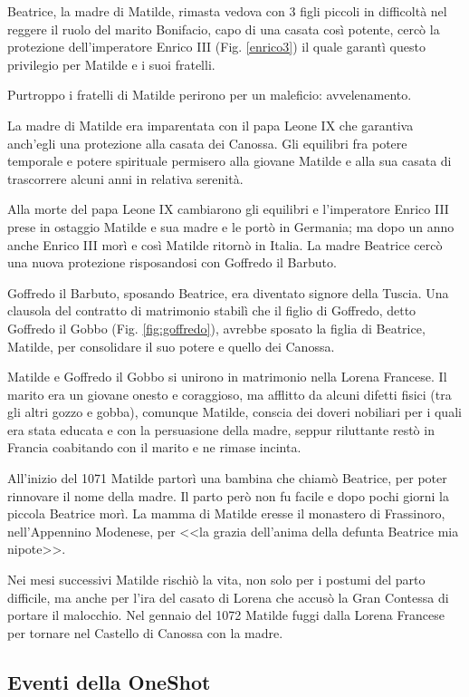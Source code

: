 \documentclass[letterpaper,twocolumn,openany,nodeprecatedcode]{dndbook}
\begin{document}
Beatrice, la madre di Matilde, rimasta vedova con 3 figli piccoli in difficoltà nel reggere il ruolo del marito Bonifacio, capo di una casata così potente, cercò la protezione dell'imperatore Enrico III (Fig. \ref{enrico3}) il quale garantì questo privilegio per Matilde e i suoi fratelli.

Purtroppo i fratelli di Matilde perirono per un maleficio: avvelenamento.

La madre di Matilde era imparentata con il papa Leone IX che garantiva anch'egli una protezione alla casata dei Canossa. Gli equilibri fra potere temporale e potere spirituale permisero alla giovane Matilde e alla sua casata di trascorrere alcuni anni in relativa serenità.

Alla morte del papa Leone IX cambiarono gli equilibri e l'imperatore Enrico III prese in ostaggio Matilde e sua madre e le portò in Germania; ma dopo un anno anche Enrico III morì e così Matilde ritornò in Italia. La madre Beatrice cercò una nuova protezione risposandosi con Goffredo il Barbuto.

Goffredo il Barbuto, sposando Beatrice, era diventato signore della Tuscia. Una clausola del contratto di matrimonio stabilì che il figlio di Goffredo, detto Goffredo il Gobbo (Fig. \ref{fig:goffredo}), avrebbe sposato la figlia di Beatrice, Matilde, per consolidare il suo potere e quello dei Canossa.

Matilde e Goffredo il Gobbo si unirono in matrimonio nella Lorena Francese. Il marito era un giovane onesto e coraggioso, ma afflitto da alcuni difetti fisici (tra gli altri gozzo e gobba), comunque Matilde, conscia dei doveri nobiliari per i quali era stata educata e con la persuasione della madre, seppur riluttante restò in Francia coabitando con il marito e ne rimase incinta.

All'inizio del 1071 Matilde partorì una bambina che chiamò Beatrice, per poter rinnovare il nome della madre. Il parto però non fu facile e dopo pochi giorni la piccola Beatrice morì. La mamma di Matilde eresse il monastero di Frassinoro, nell'Appennino Modenese, per <<la grazia dell'anima della defunta Beatrice mia nipote>>.

Nei mesi successivi Matilde rischiò la vita, non solo per i postumi del parto difficile, ma anche per l'ira del casato di Lorena che accusò la Gran Contessa di portare il malocchio. Nel gennaio del 1072 Matilde fuggi dalla Lorena Francese per tornare nel Castello di Canossa con la madre.

\subsection{Eventi della OneShot}
\end{document}
